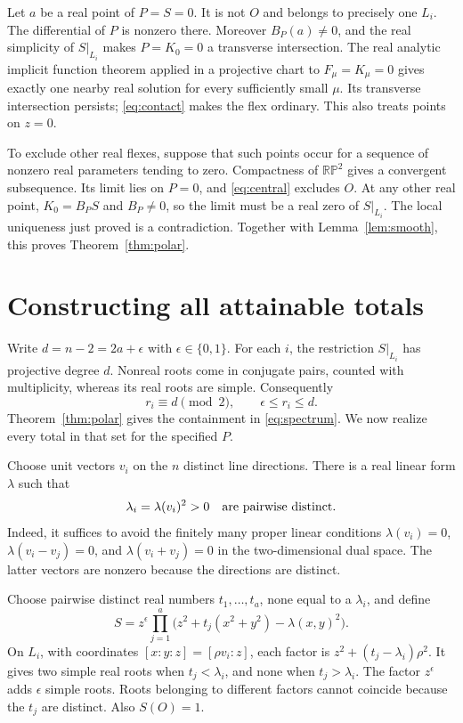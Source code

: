 \documentclass[11pt,a4paper]{article}
\theoremstyle{remark}
\newcommand{\RP}{\mathbb {RP}}
\begin{document}
Let \(a\) be a real point of \(P=S=0\). It is not \(O\) and belongs
to precisely one \(L_i\). The differential of \(P\) is nonzero
there. Moreover \(B_P(a)\ne0\), and the real simplicity of
\(S|_{L_i}\) makes \(P=K_0=0\) a transverse intersection.
The real analytic implicit function theorem applied in a projective
chart to \(F_\mu=K_\mu=0\) gives exactly one nearby real solution
for every sufficiently small \(\mu\). Its transverse intersection
persists; \eqref{eq:contact} makes the flex ordinary.
This also treats points on \(z=0\).

To exclude other real flexes, suppose that such points occur for a
sequence of nonzero real parameters tending to zero. Compactness
of \(\RP^2\) gives a convergent subsequence. Its limit lies on
\(P=0\), and \eqref{eq:central} excludes \(O\). At any other real
point, \(K_0=B_PS\) and \(B_P\ne0\), so the limit must be a real
zero of \(S|_{L_i}\). The local uniqueness just proved is a
contradiction. Together with Lemma~\ref{lem:smooth}, this proves
Theorem~\ref{thm:polar}.

\section{Constructing all attainable totals}\label{sec:construction}

Write \(d=n-2=2a+\epsilon\) with \(\epsilon\in\{0,1\}\).
For each \(i\), the restriction \(S|_{L_i}\) has projective degree
\(d\). Nonreal roots come in conjugate pairs, counted with
multiplicity, whereas its real roots are simple. Consequently
\[
 r_i\equiv d\pmod2,\qquad \epsilon\leq r_i\leq d.
\]
Theorem~\ref{thm:polar} gives the containment in
\eqref{eq:spectrum}. We now realize every total in that set for
the specified \(P\).

Choose unit vectors \(v_i\) on the \(n\) distinct line directions.
There is a real linear form \(\lambda\) such that
\[
 \lambda_i=\lambda(v_i)^2>0
 \quad\hbox{are pairwise distinct}.
\]
Indeed, it suffices to avoid the finitely many proper linear
conditions
\(\lambda(v_i)=0\), \(\lambda(v_i-v_j)=0\), and
\(\lambda(v_i+v_j)=0\) in the two-dimensional dual space.
The latter vectors are nonzero because the directions are distinct.

Choose pairwise distinct real numbers \(t_1,\ldots,t_a\), none equal
to a \(\lambda_i\), and define
\begin{equation}\label{eq:constructS}
 S=z^\epsilon\prod_{j=1}^{a}
       \bigl(z^2+t_j(x^2+y^2)-\lambda(x,y)^2\bigr).
\end{equation}
On \(L_i\), with coordinates \([x:y:z]=[\rho v_i:z]\), each
factor is \(z^2+(t_j-\lambda_i)\rho^2\). It gives two simple real
roots when \(t_j<\lambda_i\), and none when \(t_j>\lambda_i\).
The factor \(z^\epsilon\) adds \(\epsilon\) simple roots.
Roots belonging to different factors cannot coincide because the
\(t_j\) are distinct. Also \(S(O)=1\).
\end{document}
